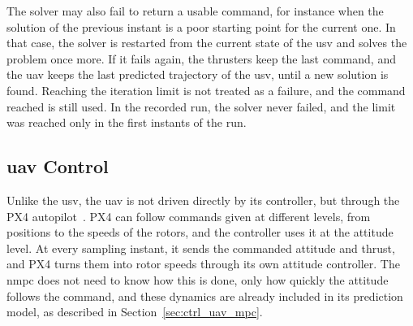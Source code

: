 The solver may also fail to return a usable command, for instance when the solution of the previous instant is a poor starting point for the current one. In that case, the solver is restarted from the current state of the \gls{usv} and solves the problem once more. If it fails again, the thrusters keep the last command, and the \gls{uav} keeps the last predicted trajectory of the \gls{usv}, until a new solution is found. Reaching the iteration limit is not treated as a failure, and the command reached is still used. In the recorded run, the solver never failed, and the limit was reached only in the first instants of the run.


\subsection{\texorpdfstring{\gls{uav} Control}{UAV Control}}
\label{subsec:uav_controller_implementation}

Unlike the \gls{usv}, the \gls{uav} is not driven directly by its controller, but through the PX4 autopilot~\cite{meier2015px4}. PX4 can follow commands given at different levels, from positions to the speeds of the rotors, and the controller uses it at the attitude level. At every sampling instant, it sends the commanded attitude and thrust, and PX4 turns them into rotor speeds through its own attitude controller. The \gls{nmpc} does not need to know how this is done, only how quickly the attitude follows the command, and these dynamics are already included in its prediction model, as described in Section~\ref{sec:ctrl_uav_mpc}.

